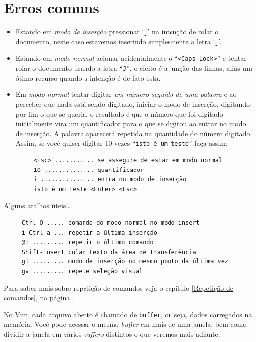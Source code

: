 \section{Erros comuns}\label{sec:Erros comuns}
\begin{itemize}

\item Estando em {\em{modo de inserção}} pressionar `{\tt j}' na intenção
de rolar o documento, neste caso estaremos inserindo simplesmente a letra `{\tt j}'. 

\item Estando em {\em{modo normal}} acionar acidentalmente o ``\verb+<Caps Lock>+'' 
e tentar rolar o documento usando a letra ``\verb+J+'', o efeito é a
junção das linhas, aliás um ótimo recurso quando a intenção é de fato esta.

\item Em {\em{modo normal}} tentar digitar {\em{um número seguido de uma palavra}} e ao perceber que 
nada está sendo digitado, iniciar o modo de inserção, digitando por fim o que se queria, 
o resultado é que o número que foi digitado inicialmente vira um quantificador para o que 
se digitou ao entrar no modo de inserção. A palavra aparecerá repetida na quantidade do 
número digitado. Assim, se você quiser digitar 10 vezes ``\verb+isto é um teste+''
 faça assim:

\begin{verbatim}
     <Esc> ........... se assegure de estar em modo normal
     10 .............. quantificador
     i ............... entra no modo de inserção
     isto é um teste <Enter> <Esc>  
\end{verbatim}

\end{itemize}

{\Large {}} Alguns atalhos úteis\dots
{}
\begin{verbatim}
     Ctrl-O ..... comando do modo normal no modo insert
     i Ctrl-a ... repetir a última inserção
     @: ......... repetir o último comando
     Shift-insert colar texto da área de transferência
     gi ......... modo de inserção no mesmo ponto da última vez
     gv ......... repete seleção visual
\end{verbatim}

Para saber mais sobre repetição de comandos veja o capítulo \ref{Repetição de comandos},
na página \pageref{Repetição de comandos}.

No Vim, cada arquivo aberto é chamado de \verb|buffer|, ou seja, dados
carregados na memória. Você pode acessar o mesmo {\em buffer} em mais de uma
janela, bem como dividir a janela em vários {\em buffers} distintos o que veremos
mais adiante.


